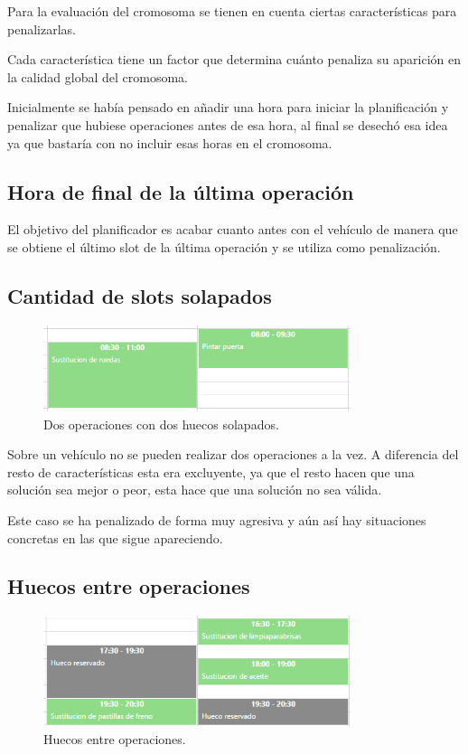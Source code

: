 \documentclass[11pt]{article}
\begin{document}
	Para la evaluación del cromosoma se tienen en cuenta ciertas características para penalizarlas.
	
	Cada característica tiene un factor que determina cuánto penaliza su aparición en la calidad global del cromosoma.
	
	Inicialmente se había pensado en añadir una hora para iniciar la planificación y penalizar que hubiese operaciones antes de esa hora, al final se desechó esa idea ya que bastaría con no incluir esas horas en el cromosoma.
	
	\subsection{Hora de final de la última operación} 
	
	El objetivo del planificador es acabar cuanto antes con el vehículo de manera que se obtiene el último slot de la última operación y se utiliza como penalización.
	
	\subsection{Cantidad de slots solapados}
	
	\begin{figure}[h]
		\centering
		\includegraphics[width= 9cm]{ejemplo-solapamiento.png}
		\caption{Dos operaciones con dos huecos solapados.}
	\end{figure}
	
	Sobre un vehículo no se pueden realizar dos operaciones a la vez. A diferencia del resto de características esta era excluyente, ya que el resto hacen que una solución sea mejor o peor, esta hace que una solución no sea válida.
	
	Este caso se ha penalizado de forma muy agresiva y aún así hay situaciones concretas en las que sigue apareciendo.
	
	\subsection{Huecos entre operaciones}
	
	\begin{figure}[h]
		\centering
		\includegraphics[width= 9cm]{ejemplo-hueco.png}
		\caption{Huecos entre operaciones.}
		\label{ejemplo-hueco}
	\end{figure}
	
\end{document}
